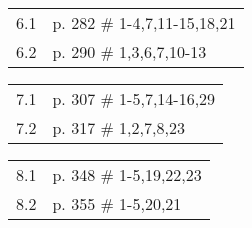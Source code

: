 \documentclass [11pt]{article}
\begin{document}
\vskip 2mm

\begin{tabular}{ll}
 6.1 & p. 282 \# 1-4,7,11-15,18,21 \\
 6.2 & p. 290 \# 1,3,6,7,10-13 \\
\end{tabular}

\vskip 2mm

\begin{tabular}{ll}
 7.1 & p. 307 \# 1-5,7,14-16,29 \\
 7.2 & p. 317 \# 1,2,7,8,23 \\
\end{tabular}

\vskip 2mm

\begin{tabular}{ll}
 8.1 & p. 348 \# 1-5,19,22,23 \\
 8.2 & p. 355 \# 1-5,20,21 \\
\end{tabular}
\end{document}
